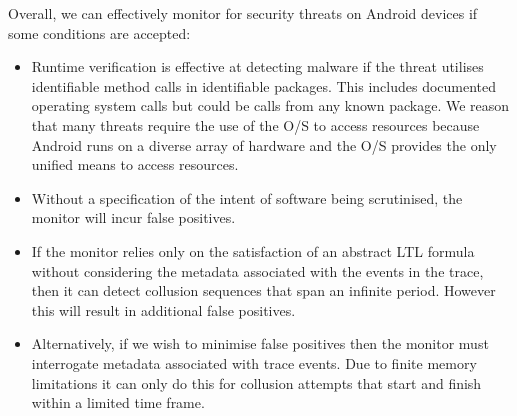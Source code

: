 \noindent
Overall, we can effectively monitor for security threats on Android devices if some conditions are accepted:

\begin{itemize}

\item Runtime verification is effective at detecting malware if the threat utilises identifiable method calls in identifiable packages.  This includes documented operating system calls but could be calls from any known package.  We reason that many threats require the use of the O/S to access resources because Android runs on a diverse array of hardware and the O/S provides the only unified means to access resources.

\item Without a specification of the intent of software being scrutinised, the monitor will incur false positives.

\item If the monitor relies only on the satisfaction of an abstract LTL formula without considering the metadata associated with the events in the trace, then it can detect collusion sequences that span an infinite period.  However this will result in additional false positives.

\item Alternatively, if we wish to minimise false positives then the monitor must interrogate metadata associated with trace events.  Due to finite memory limitations it can only do this for collusion attempts that start and finish within a limited time frame.

\end{itemize}


